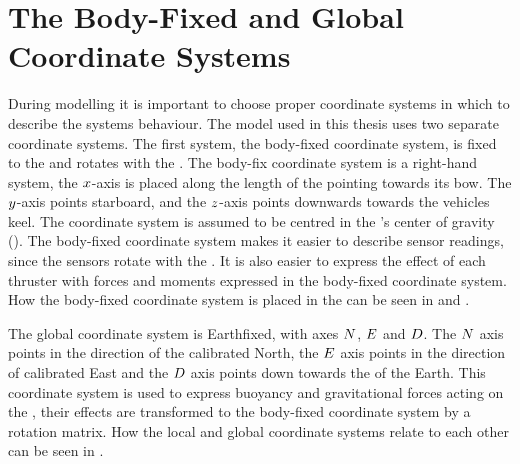 \section{The Body-Fixed and Global Coordinate Systems}
\label{sec:coordinates}
During modelling it is important to choose proper coordinate systems in which to describe the systems behaviour.
The \abbrROV model used in this thesis uses two separate coordinate systems.
The first system, the body-fixed coordinate system, is fixed to the \abbrROV and rotates with the \abbrROV. 
The body-fix coordinate system is a right-hand system, the $x$-axis is placed along the length of the \abbrROV pointing towards its bow. The $y$-axis points starboard, and the $z$-axis points downwards towards the vehicles keel. The coordinate system is assumed to be centred in the \abbrROV's  center of gravity (\abbrCG). The body-fixed coordinate system makes it easier to describe sensor readings, since the sensors rotate with the \abbrROV. It is also easier to express the effect of each thruster with forces and moments expressed in the body-fixed coordinate system. How the body-fixed coordinate system is placed in the \abbrROV can be seen in  and .

The global coordinate system is Earthfixed, with axes $N$, $E$ and $D$. The $N$ axis points in the direction of the calibrated North, the $E$ axis points in the direction of calibrated East and the $D$ axis points down towards the \abbrCG of the Earth.
This coordinate system is used to express buoyancy and gravitational forces acting on the \abbrROV, their effects are transformed to the body-fixed coordinate system by a rotation matrix. How the local and global coordinate systems relate to each other can be seen in .

